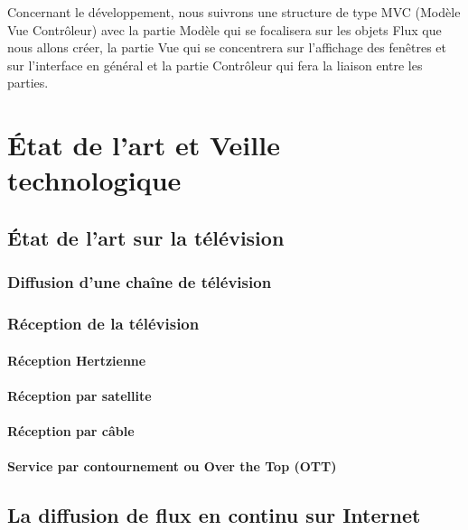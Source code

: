 \documentclass{polytech/polytech}
\begin{document}
Concernant le développement, nous suivrons une structure de type MVC (Modèle Vue Contrôleur) avec la partie Modèle qui se focalisera sur les objets Flux que nous allons créer, la partie Vue qui se concentrera sur l’affichage des fenêtres et sur l’interface en général et la partie Contrôleur qui fera la liaison entre les parties.



\part{\'{E}tat de l'art et Veille technologique}


\chapter{\'{E}tat de l'art sur la télévision}

\section{Diffusion d'une chaîne de télévision}

\section{Réception de la télévision}

\subsection{Réception Hertzienne}

\subsection{Réception par satellite}

\subsection{Réception par câble}

\subsection{Service par contournement ou Over the Top (OTT)}


\chapter{La diffusion de flux en continu sur Internet}
\label{chap:diffusion_flux}
\end{document}
